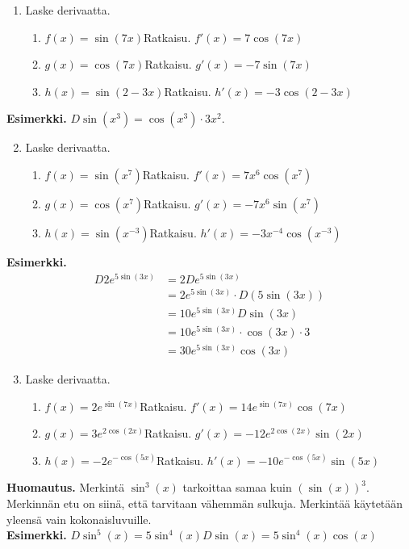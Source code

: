 \documentclass[10pt]{article}
\newcommand{\ratkaisu}[1]{\hfill{\color{blue}\quad\textrm{Ratkaisu. } #1}}
\begin{document}
\begin{enumerate}
\item Laske derivaatta.
\begin{enumerate}
\item $f(x)=\sin(7x)$\ratkaisu{$f'(x)=7\cos(7x)$}
\item $g(x)=\cos(7x)$\ratkaisu{$g'(x)=-7\sin(7x)$}
\item $h(x)=\sin(2-3x)$\ratkaisu{$h'(x)=-3\cos(2-3x)$}
\end{enumerate}    
\end{enumerate}
\textbf{Esimerkki.} $D\sin(x^3)=\cos(x^3)\cdot 3x^2$.

\begin{enumerate}
\setcounter{enumi}{1}
\item Laske derivaatta.
\begin{enumerate}
\item $f(x)=\sin(x^7)$\ratkaisu{$f'(x)=7x^6\cos(x^7)$}
\item $g(x)=\cos(x^7)$\ratkaisu{$g'(x)=-7x^6\sin(x^7)$}
\item $h(x)=\sin(x^{-3})$\ratkaisu{$h'(x)=-3x^{-4}\cos(x^{-3})$}
\end{enumerate}    
\end{enumerate}
\textbf{Esimerkki.}
\begin{equation*}
\begin{split}
D2e^{5\sin(3x)}
&=2De^{5\sin(3x)}\\
&=2e^{5\sin(3x)}\cdot D(5\sin(3x))\\
&=10e^{5\sin(3x)}D\sin(3x)\\
&=10e^{5\sin(3x)}\cdot\cos(3x)\cdot 3\\
&=30e^{5\sin(3x)}\cos(3x)
\end{split}
\end{equation*}


\begin{enumerate}
\setcounter{enumi}{2}
\item Laske derivaatta.
\begin{enumerate}
\item $f(x)=2e^{\sin(7x)}$\ratkaisu{$f'(x)=14e^{\sin(7x)}\cos(7x)$}
\item $g(x)=3e^{2\cos(2x)}$\ratkaisu{$g'(x)=-12e^{2\cos(2x)}\sin(2x)$}
\item $h(x)=-2e^{-\cos(5x)}$\ratkaisu{$h'(x)=-10e^{-\cos(5x)}\sin(5x)$}
\end{enumerate}    
\end{enumerate}
\textbf{Huomautus.} Merkintä $\sin^3(x)$ tarkoittaa samaa kuin $(\sin(x))^3$. Merkinnän etu on siinä, että tarvitaan vähemmän sulkuja. Merkintää käytetään yleensä vain kokonaisluvuille.\\[2mm]
\textbf{Esimerkki.} $D\sin^5(x)=5\sin^4(x) D\sin(x)=5\sin^4(x)\cos(x)$
\end{document}
